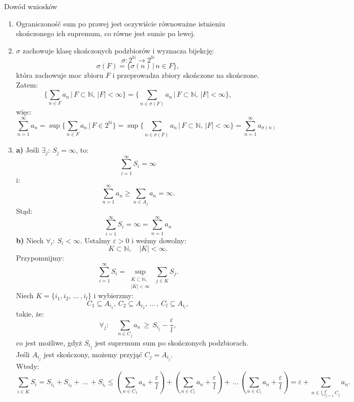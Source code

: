 \documentclass{article}
\numberwithin{defi}{section}
\numberwithin{theo}{section}
\numberwithin{defi}{section}
\newcommand{\N}{\mathbb{N}}
\newcommand{\oo}{\infty}
\begin{document}
\begin{dow}{Dowód wniosków}
    \begin{enumerate}
        \item Ograniczoność sum po prawej jest oczywiście równoważne istnieniu skończonego ich supremum, co równe jest sumie po lewej.
        \item $\sigma$ zachowuje klasę skończonych podzbiorów i wyznacza bijekcję:
              \[\sigma: 2^{\N} \rightarrow 2^{\N}\]
              \[\sigma(F) = \{ \sigma(n)\,|\, n \in F \},\]
              która zachowuje moc zbioru $F$ i przeprowadza zbiory skończone na skończone. Zatem:
              \[\biggl\{ \sum_{n \in F} a_n \, \bigg| \, F \subset \N, \, |F| < \oo\biggr\} = \biggl\{ \sum_{n \in \sigma(F)} a_{n} \, \bigg| \, F \subset \N, \, |F| < \oo\biggr\}, \]
              więc:
              \[ \sum_{n=1}^{\oo} a_n = \sup{\biggl\{ \sum_{n \in F} a_n \, \bigg| \, F \in 2^{\N}\biggr\}}  = \sup{\biggl\{ \sum_{n \in \sigma(F)} a_{n} \, \bigg| \, F \subset \N, \, |F| < \oo\biggr\}} = \sum_{n=1}^{\oo} a_{\sigma(n)}\]
        \item
              \textbf{a)} Jeśli $\exists_j: \, S_j = \oo$, to:
              \[\sum_{i=1}^{\oo} S_i = \oo\]
              i:
              \[\sum_{n=1}^{\oo} a_n \geqslant \sum_{n \in A_j} a_n = \oo.\]
              Stąd:
              \[\sum_{i=1}^{\oo} S_i = \oo = \sum_{n=1}^{\oo} a_n\]
              \textbf{b)} Niech $\forall_{i}: \, S_i < \oo$. Ustalmy $\varepsilon > 0$ i weźmy dowolny:
              \[K \subset \N, \quad |K| < \oo.\]
              Przypomnijmy:
              \[\sum_{i=1}^{\oo}S_i = \sup_{\substack{K \subset \N, \\ |K| < \oo}} \, \sum_{j \in K} S_j.\]
              Niech $K = \{ i_1, i_2,\, ...\,, i_l \}$ i wybierzmy:
              \[C_1 \subseteq A_{i_1}, \, C_2 \subseteq A_{i_2}, \, ...\, , \, C_l \subseteq A_{i_l}, \]
              takie, że:
              \[\forall_j: \quad \sum_{n \in C_j} a_n \,  \geqslant \, S_{i_j} - \frac{\varepsilon}{l},\]
              co jest możliwe, gdyż $S_{i_j}$ jest supremum sum po skończonych podzbiorach. Jeśli $A_{i_j}$ jest skończony, możemy przyjąć $C_j = A_{i_j}$. \\
              Wtedy:
              \[\sum_{i \in K} S_i = S_{i_1} + S_{i_2} + \, ... \, + S_{i_l} \leqslant \left( \sum_{n\in C_1} a_n + \frac{\varepsilon}{l} \right) + \left( \sum_{n\in C_l} a_n + \frac{\varepsilon}{l} \right) + \, ... \, \left( \sum_{n\in C_l} a_n + \frac{\varepsilon}{l} \right) = \varepsilon + \sum_{n \in \bigcup_{j=1}^l C_j} a_n.\]

\end{enumerate}
\end{dow}
\end{document}
